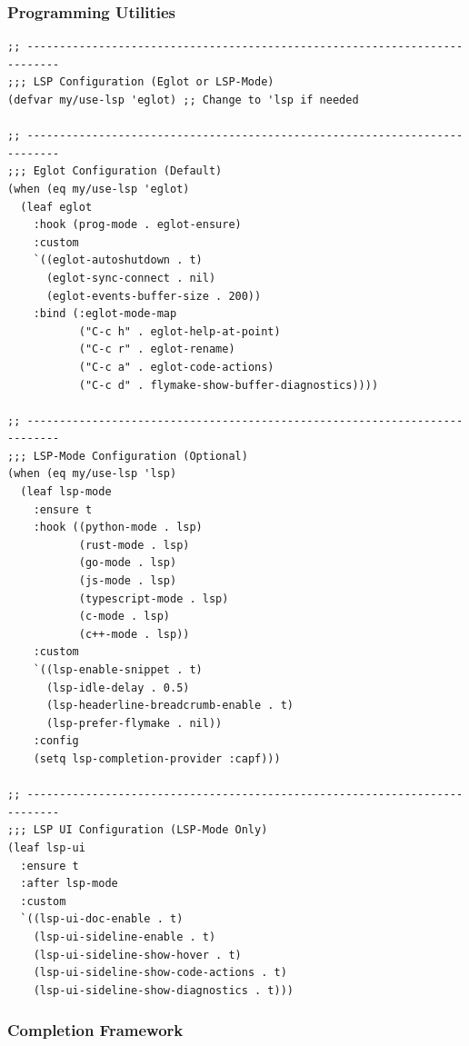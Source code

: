 \documentclass[11pt]{article}
\begin{document}
\subsubsection{Programming Utilities}
\label{sec:orgf6e9434}

\begin{verbatim}
;; ---------------------------------------------------------------------------
;;; LSP Configuration (Eglot or LSP-Mode)
(defvar my/use-lsp 'eglot) ;; Change to 'lsp if needed

;; ---------------------------------------------------------------------------
;;; Eglot Configuration (Default)
(when (eq my/use-lsp 'eglot)
  (leaf eglot
    :hook (prog-mode . eglot-ensure)
    :custom
    `((eglot-autoshutdown . t)
      (eglot-sync-connect . nil)
      (eglot-events-buffer-size . 200))
    :bind (:eglot-mode-map
           ("C-c h" . eglot-help-at-point)
           ("C-c r" . eglot-rename)
           ("C-c a" . eglot-code-actions)
           ("C-c d" . flymake-show-buffer-diagnostics))))

;; ---------------------------------------------------------------------------
;;; LSP-Mode Configuration (Optional)
(when (eq my/use-lsp 'lsp)
  (leaf lsp-mode
    :ensure t
    :hook ((python-mode . lsp)
           (rust-mode . lsp)
           (go-mode . lsp)
           (js-mode . lsp)
           (typescript-mode . lsp)
           (c-mode . lsp)
           (c++-mode . lsp))
    :custom
    `((lsp-enable-snippet . t)
      (lsp-idle-delay . 0.5)
      (lsp-headerline-breadcrumb-enable . t)
      (lsp-prefer-flymake . nil))
    :config
    (setq lsp-completion-provider :capf)))

;; ---------------------------------------------------------------------------
;;; LSP UI Configuration (LSP-Mode Only)
(leaf lsp-ui
  :ensure t
  :after lsp-mode
  :custom
  `((lsp-ui-doc-enable . t)
    (lsp-ui-sideline-enable . t)
    (lsp-ui-sideline-show-hover . t)
    (lsp-ui-sideline-show-code-actions . t)
    (lsp-ui-sideline-show-diagnostics . t)))
\end{verbatim}
\subsubsection{Completion Framework}
\label{sec:org86fa72f}
\end{document}
